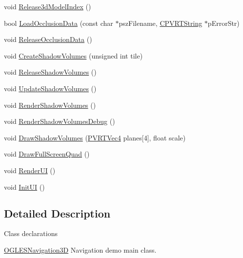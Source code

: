 \begin{DoxyCompactItemize}
\item 
void \hyperlink{class_o_g_l_e_s_navigation3_d_ab66ca73335d119f9ec5474a7edf0b0d8}{Release3d\+Model\+Index} ()
\item 
bool \hyperlink{class_o_g_l_e_s_navigation3_d_a54c1d517411565e81e9dd7c34a1265f8}{Load\+Occlusion\+Data} (const char $\ast$psz\+Filename, \hyperlink{class_c_p_v_r_t_string}{C\+P\+V\+R\+T\+String} $\ast$p\+Error\+Str)
\item 
void \hyperlink{class_o_g_l_e_s_navigation3_d_af8260302e55cd6985e3d7bf12981d4a9}{Release\+Occlusion\+Data} ()
\item 
void \hyperlink{class_o_g_l_e_s_navigation3_d_aa31e8c1875cf6fc25418cc5ebec5356c}{Create\+Shadow\+Volumes} (unsigned int tile)
\item 
void \hyperlink{class_o_g_l_e_s_navigation3_d_afb565ae488565457bf5415b7d46f28f6}{Release\+Shadow\+Volumes} ()
\item 
void \hyperlink{class_o_g_l_e_s_navigation3_d_a00b4833d563f86803ec23ba031bada57}{Update\+Shadow\+Volumes} ()
\item 
void \hyperlink{class_o_g_l_e_s_navigation3_d_a49a1ff3e126015e6753d274a0aa5b493}{Render\+Shadow\+Volumes} ()
\item 
void \hyperlink{class_o_g_l_e_s_navigation3_d_a0728631d47c1e99afbdd6bc2796dafcd}{Render\+Shadow\+Volumes\+Debug} ()
\item 
void \hyperlink{class_o_g_l_e_s_navigation3_d_ab80b67fdc45b06f8bfba4747812910da}{Draw\+Shadow\+Volumes} (\hyperlink{struct_p_v_r_t_vec4}{P\+V\+R\+T\+Vec4} planes\mbox{[}4\mbox{]}, float scale)
\item 
void \hyperlink{class_o_g_l_e_s_navigation3_d_acbec4cf27e8e0da7e398a273b448ec17}{Draw\+Full\+Screen\+Quad} ()
\item 
void \hyperlink{class_o_g_l_e_s_navigation3_d_a37294f3a3f25a125283c73c9571f0c0c}{Render\+U\+I} ()
\item 
void \hyperlink{class_o_g_l_e_s_navigation3_d_a634cf3c85d7f75e6b24b5bafc5912397}{Init\+U\+I} ()
\end{DoxyCompactItemize}


\subsection{Detailed Description}


 Class declarations



  \hyperlink{class_o_g_l_e_s_navigation3_d}{O\+G\+L\+E\+S\+Navigation3\+D}  Navigation demo main class. 

